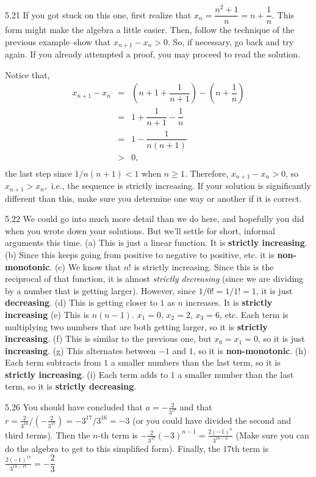 \begin{Answer}{5.21}
If you got stuck on this one, first realize that $x_n=\dfrac{n^2 + 1}{n} = n + \dfrac{1}{n}$.
This form might make the algebra a little easier.
Then, follow the technique of the previous example--show that
$x_{n + 1} - x_n >0$.  So, if necessary, go back and try again.
If you already attempted a proof, you may proceed to read the solution.

Notice that, $$ \begin{array}{lll}x_{n + 1} - x_n & = & \left(n + 1 +
\dfrac{1}{n + 1}\right) -\left(n  + \dfrac{1}{n
}\right) \\
& = & 1 + \dfrac{1}{n + 1} - \dfrac{1}{n} \\
& = & 1 -\dfrac{1}{n(n +1)} \\
& > & 0,\\
\end{array}$$
the last step since  $1/n(n+1)<1$ when $n\geq 1$.
Therefore, $x_{n + 1} - x_n > 0$, so $x_{n + 1}> x_n,$
i.e., the sequence is strictly increasing.
If your solution is significantly different than this, make sure you determine one way or another
if it is correct.
\end{Answer}
\begin{Answer}{5.22}
We could go into much more detail than we do here, and hopefully you did when you wrote down
your solutions.  But we'll settle for short, informal arguments this time.
 (a) This is just a linear function.  It is {\bf strictly increasing}.
 (b) Since this keeps going from positive to negative to positive, etc. it is {\bf non-monotonic}.
 (c) We know that $n!$ is strictly increasing.  Since this is the reciprocal of that function, it
 is almost {\em strictly decreasing} (since we are dividing by a number that is getting larger).
 However, since $1/0!=1/1!=1$, it is just {\bf decreasing}.
(d) This is getting closer to $1$ as $n$ increases.  It is {\bf strictly increasing}
(e) This is $n(n-1)$.  $x_1=0$, $x_2=2$, $x_3=6$, etc.
Each term is multiplying two numbers that are both
getting larger, so it is {\bf strictly increasing}.
(f) This is similar to the previous one, but $x_0=x_1=0$, so it is just {\bf increasing}.
(g) This alternates between $-1$ and $1$, so it is {\bf non-monotonic}.
(h) Each term subtracts from $1$ a smaller numbers than the last term, so it is {\bf strictly increasing}.
(i) Each term adds to $1$ a smaller number than the last term, so it is {\bf strictly decreasing}.
\end{Answer}
\begin{Answer}{5.26}
You should have concluded that $a=-\frac{2}{3^{17}}$ and that
$r=\frac{2}{3^{16}}/\left(-\frac{2}{3^{17}}\right)=-3^{17}/3^{16}=-3$
(or you could have divided the second and third terms).
Then the $n$-th term is
$-\frac{2}{3^{17}}\left(-3\right)^{n-1}=\frac{2(-1)^{n}}{3^{18-n}}$
(Make sure you can do the algebra to get to this simplified form).
Finally, the $17$th term is
$\frac{2(-1)^{17}}{3^{18-17}}=-\dfrac{2}{3}$
\end{Answer}
